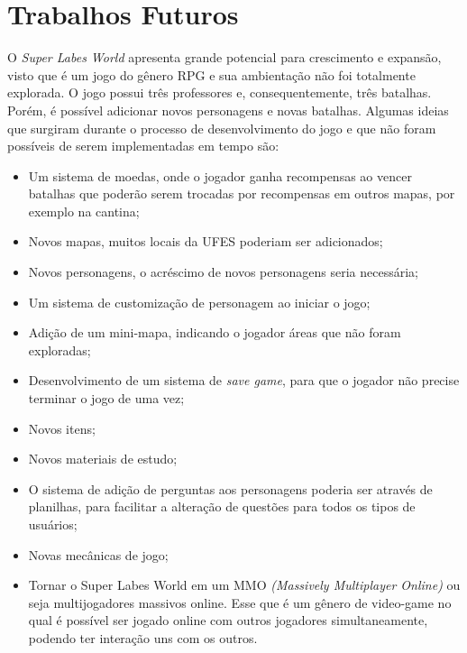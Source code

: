 \section{Trabalhos Futuros}
\label{sec-conclusoes-trabalhosfuturos}


O \textit{Super Labes World} apresenta grande potencial para crescimento e expansão, visto que é um jogo do gênero RPG e sua ambientação não foi totalmente explorada. O jogo possui três professores e, consequentemente, três batalhas. Porém, é possível adicionar novos personagens e novas batalhas. Algumas ideias que surgiram durante o processo de desenvolvimento do jogo e que não foram possíveis de serem implementadas em tempo são:

\begin{itemize}
    \item Um sistema de moedas, onde o jogador ganha recompensas ao vencer batalhas que poderão serem trocadas por recompensas em outros mapas, por exemplo na cantina;
    \item Novos mapas, muitos locais da UFES poderiam ser adicionados;
    \item Novos personagens, o acréscimo de novos personagens seria necessária;
    \item Um sistema de customização de personagem ao iniciar o jogo;
    \item Adição de um mini-mapa, indicando o jogador áreas que não foram exploradas;
    \item Desenvolvimento de um sistema de \textit{save game}, para que o jogador não precise terminar o jogo de uma vez;
    \item Novos itens;
    \item Novos materiais de estudo;
    \item O sistema de adição de perguntas aos personagens poderia ser através de planilhas, para facilitar a alteração de questões para todos os tipos de usuários;
    \item Novas mecânicas de jogo;
    \item Tornar o Super Labes World em um MMO \textit{(Massively Multiplayer Online)} ou seja multijogadores massivos online. Esse que é um gênero de video-game no qual é possível ser jogado online com outros jogadores simultaneamente, podendo ter interação uns com os outros.
\end{itemize}

